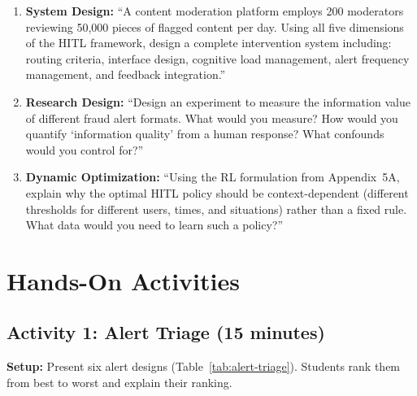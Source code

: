 \begin{enumerate}
    \item \textbf{System Design:} ``A content moderation platform employs 200 moderators reviewing 50,000 pieces of flagged content per day. Using all five dimensions of the HITL framework, design a complete intervention system including: routing criteria, interface design, cognitive load management, alert frequency management, and feedback integration.''

    \item \textbf{Research Design:} ``Design an experiment to measure the information value of different fraud alert formats. What would you measure? How would you quantify `information quality' from a human response? What confounds would you control for?''

    \item \textbf{Dynamic Optimization:} ``Using the RL formulation from Appendix~5A, explain why the optimal HITL policy should be context-dependent (different thresholds for different users, times, and situations) rather than a fixed rule. What data would you need to learn such a policy?''
\end{enumerate}

\section{Hands-On Activities}

\subsection{Activity 1: Alert Triage (15 minutes)}

\textbf{Setup:} Present six alert designs (Table~\ref{tab:alert-triage}). Students rank them from best to worst and explain their ranking.

